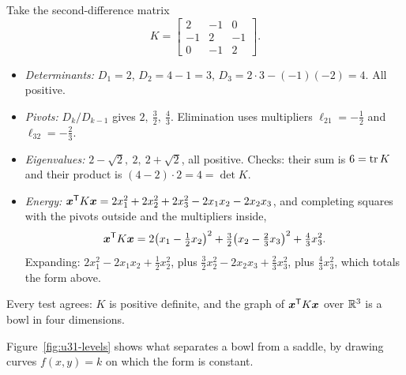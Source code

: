 \begin{example}\label{ex:u31-K}
Take the second-difference matrix
\[
  K=\begin{bmatrix}2&-1&0\\-1&2&-1\\0&-1&2\end{bmatrix}.
\]
\begin{itemize}
  \item \emph{Determinants:} $D_1=2$, $D_2=4-1=3$, $D_3=2\cdot3-(-1)(-2)=4$. All positive.
  \item \emph{Pivots:} $D_k/D_{k-1}$ gives $2,\ \tfrac32,\ \tfrac43$. Elimination uses multipliers
        $\ell_{21}=-\tfrac12$ and $\ell_{32}=-\tfrac23$.
  \item \emph{Eigenvalues:} $2-\sqrt2,\ 2,\ 2+\sqrt2$, all positive. Checks: their sum is $6=\operatorname{tr} K$
        and their product is $(4-2)\cdot2=4=\det K$.
  \item \emph{Energy:} $\boldsymbol{x}^{\mathsf{T}} K\boldsymbol{x}=2x_1^2+2x_2^2+2x_3^2-2x_1x_2-2x_2x_3$, and completing squares with
        the pivots outside and the multipliers inside,
        \[
          \boldsymbol{x}^{\mathsf{T}} K\boldsymbol{x}=2\bigl(x_1-\tfrac12x_2\bigr)^2+\tfrac32\bigl(x_2-\tfrac23x_3\bigr)^2+\tfrac43x_3^2 .
        \]
        Expanding: $2x_1^2-2x_1x_2+\tfrac12x_2^2$, plus $\tfrac32x_2^2-2x_2x_3+\tfrac23x_3^2$, plus
        $\tfrac43x_3^2$, which totals the form above.
\end{itemize}
Every test agrees: $K$ is positive definite, and the graph of $\boldsymbol{x}^{\mathsf{T}} K\boldsymbol{x}$ over $\mathbb{R}^3$ is a bowl in
four dimensions.
\end{example}

Figure~\ref{fig:u31-levels} shows what separates a bowl from a saddle, by drawing curves
$f(x,y)=k$ on which the form is constant.

